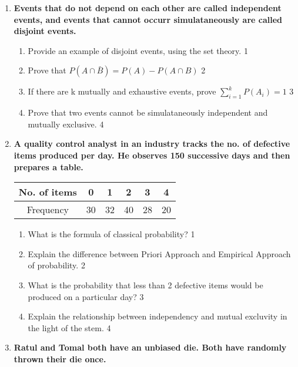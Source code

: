 \documentclass[a4paper,oneside, margin=1.4in]{book}
\begin{document}
\begin{enumerate}

     \item
	  \textbf{Events that do not depend on each other are called independent events, and events that cannot occurr simulataneously are called disjoint events.} 
  
  \begin{enumerate}
    \item
	Provide an example of disjoint events, using the set theory. \hfill 1
    \item
	Prove that $P(A\cap \bar B) = P(A) - P(A\cap B)$ \hfill 2
    \item  
	If there are k mutually and exhaustive events, prove $\displaystyle \sum_{i=1}^k P(A_i) = 1$ \hfill 3
    \item
	Prove that two events cannot be simulataneously independent and mutually exclusive. \hfill 4
  \end{enumerate}

 \item
	  \textbf{A quality control analyst in an industry tracks the no. of defective items produced per day. He observes 150 successive days and then prepares a table.} 
	  
	  \begin{table}[h]
	  \centering
\begin{tabular}{c|c|c|c|c|c} \hline
No. of items & 0 & 1 & 2 & 3 & 4 \\ \hline
Frequency & 30 & 32 & 40 & 28 & 20 \\ \hline
\end{tabular}
\end{table}
  
  \begin{enumerate}
    \item
	What is the formula of classical probability? \hfill 1
    \item
	Explain the difference between Priori Approach and Empirical Approach of probability. \hfill 2
    \item  
	What is the probability that less than 2 defective items would be produced on a particular day? \hfill 3
    \item
	Explain the relationship between independency and mutual excluvity in the light of the stem. \hfill 4
  \end{enumerate}
  
     \item
	  \textbf{Ratul and Tomal both have an unbiased die. Both have randomly thrown their die once. } 
  

\end{enumerate}
\end{document}
